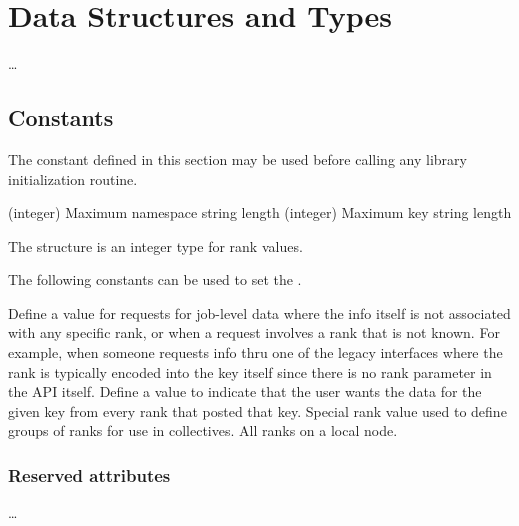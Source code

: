 \chapter{Data Structures and Types}
\label{chap:struct}

\ldots

\section{Constants}

The constant defined in this section may be used before calling any library initialization routine.

\begin{constantdesc}
%
 (integer)
Maximum namespace string length
%
 (integer)
Maximum key string length
%
\end{constantdesc}

The  structure is an integer type for rank values.

The following constants can be used to set the .

\begin{constantdesc}
%
Define a value for requests for job-level data where the info itself is not associated with any specific rank, or when a request involves a rank that is not known.
For example, when someone requests info thru one of the legacy interfaces where the rank is typically encoded into the key itself since there is no rank parameter in the API itself.
%
Define a value to indicate that the user wants the data for the given key from every rank that posted that key.
%
Special rank value used to define groups of ranks for use in collectives.
All ranks on a local node.
%
\end{constantdesc}


\subsection{Reserved attributes}
\label{api:struct:attributes}

\ldots

